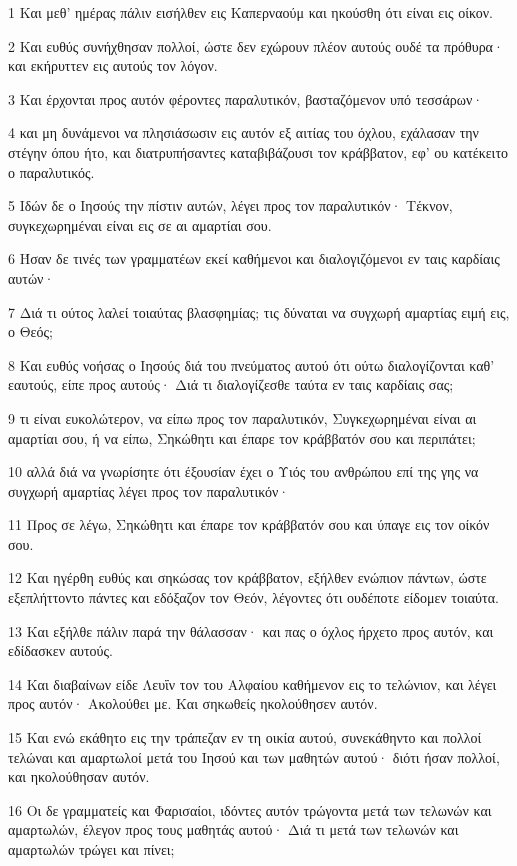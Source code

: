 \par 1 Και μεθ' ημέρας πάλιν εισήλθεν εις Καπερναούμ και ηκούσθη ότι είναι εις οίκον.
\par 2 Και ευθύς συνήχθησαν πολλοί, ώστε δεν εχώρουν πλέον αυτούς ουδέ τα πρόθυρα· και εκήρυττεν εις αυτούς τον λόγον.
\par 3 Και έρχονται προς αυτόν φέροντες παραλυτικόν, βασταζόμενον υπό τεσσάρων·
\par 4 και μη δυνάμενοι να πλησιάσωσιν εις αυτόν εξ αιτίας του όχλου, εχάλασαν την στέγην όπου ήτο, και διατρυπήσαντες καταβιβάζουσι τον κράββατον, εφ' ου κατέκειτο ο παραλυτικός.
\par 5 Ιδών δε ο Ιησούς την πίστιν αυτών, λέγει προς τον παραλυτικόν· Τέκνον, συγκεχωρημέναι είναι εις σε αι αμαρτίαι σου.
\par 6 Ήσαν δε τινές των γραμματέων εκεί καθήμενοι και διαλογιζόμενοι εν ταις καρδίαις αυτών·
\par 7 Διά τι ούτος λαλεί τοιαύτας βλασφημίας; τις δύναται να συγχωρή αμαρτίας ειμή εις, ο Θεός;
\par 8 Και ευθύς νοήσας ο Ιησούς διά του πνεύματος αυτού ότι ούτω διαλογίζονται καθ' εαυτούς, είπε προς αυτούς· Διά τι διαλογίζεσθε ταύτα εν ταις καρδίαις σας;
\par 9 τι είναι ευκολώτερον, να είπω προς τον παραλυτικόν, Συγκεχωρημέναι είναι αι αμαρτίαι σου, ή να είπω, Σηκώθητι και έπαρε τον κράββατόν σου και περιπάτει;
\par 10 αλλά διά να γνωρίσητε ότι έξουσίαν έχει ο Υιός του ανθρώπου επί της γης να συγχωρή αμαρτίας λέγει προς τον παραλυτικόν·
\par 11 Προς σε λέγω, Σηκώθητι και έπαρε τον κράββατόν σου και ύπαγε εις τον οίκόν σου.
\par 12 Και ηγέρθη ευθύς και σηκώσας τον κράββατον, εξήλθεν ενώπιον πάντων, ώστε εξεπλήττοντο πάντες και εδόξαζον τον Θεόν, λέγοντες ότι ουδέποτε είδομεν τοιαύτα.
\par 13 Και εξήλθε πάλιν παρά την θάλασσαν· και πας ο όχλος ήρχετο προς αυτόν, και εδίδασκεν αυτούς.
\par 14 Και διαβαίνων είδε Λευΐν τον του Αλφαίου καθήμενον εις το τελώνιον, και λέγει προς αυτόν· Ακολούθει με. Και σηκωθείς ηκολούθησεν αυτόν.
\par 15 Και ενώ εκάθητο εις την τράπεζαν εν τη οικία αυτού, συνεκάθηντο και πολλοί τελώναι και αμαρτωλοί μετά του Ιησού και των μαθητών αυτού· διότι ήσαν πολλοί, και ηκολούθησαν αυτόν.
\par 16 Οι δε γραμματείς και Φαρισαίοι, ιδόντες αυτόν τρώγοντα μετά των τελωνών και αμαρτωλών, έλεγον προς τους μαθητάς αυτού· Διά τι μετά των τελωνών και αμαρτωλών τρώγει και πίνει;
